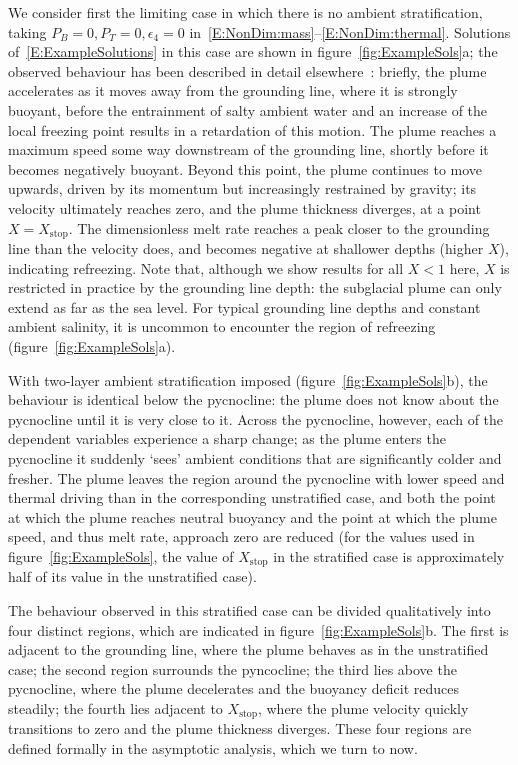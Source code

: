 \documentclass{jfm}
\newcommand{\epsfour}{\epsilon_{4}}
\newcommand{\Pb}{\textit{P}_B}  %
\newcommand{\Pt}{\textit{P}_T}
\begin{document}
We consider first the limiting case in which there is no ambient stratification, taking $\Pb = 0, \Pt = 0, \epsfour = 0$ in~\eqref{E:NonDim:mass}--\eqref{E:NonDim:thermal}. Solutions of~\eqref{E:ExampleSolutions} in this case are shown in figure~\ref{fig:ExampleSols}a; the observed behaviour has been described in detail elsewhere~\citep[see][for example]{Jenkins1991JGeophysResOceans, Jenkins2011JPhysOcean, Magorrian2016JGeoResOcean, Hewitt2020AnnRevFlu}: briefly, the plume accelerates as it moves away from the grounding line, where it is strongly buoyant, before the entrainment of salty ambient water and an increase of the local freezing point results in a retardation of this motion. The plume reaches a maximum speed some way downstream of the grounding line, shortly before it becomes negatively buoyant. Beyond this point, the plume continues to move upwards, driven by its momentum but increasingly restrained by gravity; its velocity ultimately reaches zero, and the plume thickness diverges, at a point $X = X_{\text{stop}}$. The dimensionless melt rate reaches a peak closer to the grounding line than the velocity does, and becomes negative at shallower depths (higher $X$), indicating refreezing. Note that, although we show results for all $X < 1$ here, $X$ is restricted in practice by the grounding line depth: the subglacial plume can only extend as far as the sea level. For typical grounding line depths and constant ambient salinity, it is uncommon to encounter the region of refreezing (figure~\ref{fig:ExampleSols}a). 

With two-layer ambient stratification imposed (figure~\ref{fig:ExampleSols}b), the behaviour is identical below the pycnocline: the plume does not know about the pycnocline until it is very close to it. Across the pycnocline, however, each of the dependent variables experience a sharp change; as the plume enters the pycnocline it suddenly `sees' ambient conditions that are significantly colder and fresher. The plume leaves the region around the pycnocline with lower speed and thermal driving than in the corresponding unstratified case, and both the point at which the plume reaches neutral buoyancy and the point at which the plume speed, and thus melt rate, approach zero are reduced (for the values used in figure~\ref{fig:ExampleSols}, the value of $X_{\text{stop}}$ in the stratified case is approximately half of its value in the unstratified case).

The behaviour observed in this stratified case can be divided qualitatively into four distinct regions, which are indicated in figure~\ref{fig:ExampleSols}b. The first is adjacent to the grounding line, where the plume behaves as in the unstratified case; the second region surrounds the pyncocline; the third lies above the pycnocline, where the plume decelerates and the buoyancy deficit reduces steadily; the fourth lies adjacent to $X_{\text{stop}}$, where the plume velocity quickly transitions to zero and the plume thickness diverges.  These four regions are defined formally in the asymptotic analysis, which we turn to now. 
\end{document}
